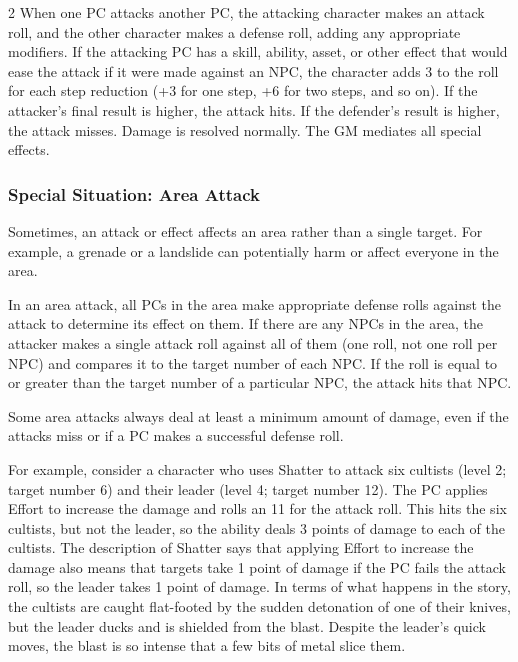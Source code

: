 \begin{multicols}{2}
When one PC attacks another PC, the attacking character makes an attack roll, and the other character makes a defense roll, adding any appropriate modifiers. If the attacking PC has a skill, ability, asset, or other effect that would ease the attack if it were made against an NPC, the character adds 3 to the roll for each step reduction (+3 for one step, +6 for two steps, and so on). If the attacker’s final result is higher, the attack hits. If the defender’s result is higher, the attack misses. Damage is resolved normally. The GM mediates all special effects.

\subsubsection{Special Situation: Area Attack}

Sometimes, an attack or effect affects an area rather than a single target. For example, a grenade or a landslide can potentially harm or affect everyone in the area.

In an area attack, all PCs in the area make appropriate defense rolls against the attack to determine its effect on them. If there are any NPCs in the area, the attacker makes a single attack roll against all of them (one roll, not one roll per NPC) and compares it to the target number of each NPC. If the roll is equal to or greater than the target number of a particular NPC, the attack hits that NPC.

Some area attacks always deal at least a minimum amount of damage, even if the attacks miss or if a PC makes a successful defense roll.

For example, consider a character who uses Shatter to attack six cultists (level 2; target number 6) and their leader (level 4; target number 12). The PC applies Effort to increase the damage and rolls an 11 for the attack roll. This hits the six cultists, but not the leader, so the ability deals 3 points of damage to each of the cultists. The description of Shatter says that applying Effort to increase the damage also means that targets take 1 point of damage if the PC fails the attack roll, so the leader takes 1 point of damage. In terms of what happens in the story, the cultists are caught flat-footed by the sudden detonation of one of their knives, but the leader ducks and is shielded from the blast. Despite the leader’s quick moves, the blast is so intense that a few bits of metal slice them.


\end{multicols}
